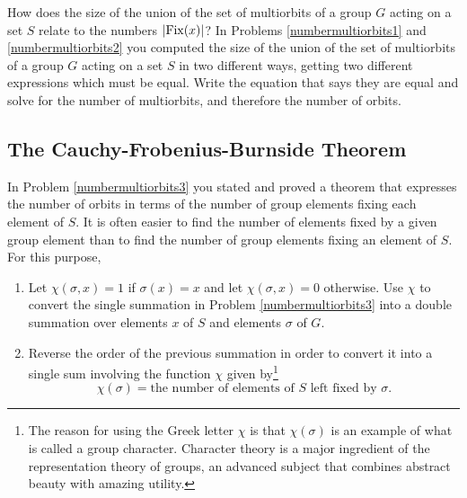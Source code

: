 \iteme How does the size of the union of the set of multiorbits of a group
$G$ acting on a set $S$ relate to the numbers $|{\rm
Fix}(x)|$?\label{numbermultiorbits2}
\iteme In Problems \ref{numbermultiorbits1} and \ref{numbermultiorbits2}
you computed the size of the union of the set of multiorbits of a group
$G$ acting on a set $S$ in two different ways, getting two different
expressions which must be equal.  Write the
equation that says they are equal and solve for the number of multiorbits, and
therefore the number of orbits.\label{numbermultiorbits3}
\ep

\subsection{The Cauchy-Frobenius-Burnside Theorem}
\bp
\iteme In Problem \ref{numbermultiorbits3} you stated and proved a theorem
that expresses the number of orbits in terms of the number of group
elements fixing each element of $S$.  It is often easier to find the
number of elements fixed by a given group element than to find the number
of group elements fixing an element of $S$.  For this purpose,
  \begin{enumerate} 
\item Let $\chi(\sigma,x)=1$ if $\sigma(x)=x$ and let
$\chi(\sigma,x) =0$ otherwise.  Use $\chi$ to convert the single summation
in Problem
\ref{numbermultiorbits3} into a double summation over elements $x$ of $S$
and elements $\sigma$ of $G$.
\item Reverse the order of the previous summation in order to convert it
into a single sum involving the function $\chi$ given by\footnote{The reason
for using the Greek letter $\chi$ is that $\chi(\sigma)$ is an example of
what is called a group character.  Character theory is a major ingredient of
the representation theory of groups, an advanced subject that combines
abstract beauty with amazing utility.}
$$\chi(\sigma) =
\mbox{the number of elements of $S$ left fixed by $\sigma$}.$$
\end{enumerate}\label{numbermultiorbits4}


